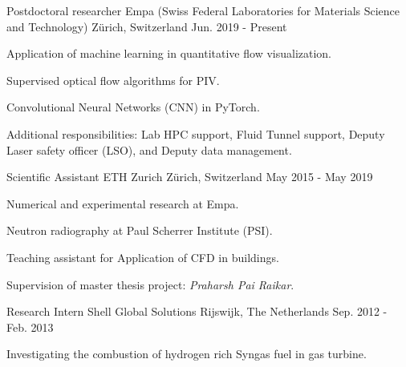\documentclass[11pt, a4paper]{awesome-cv}
\begin{document}
\begin{cventries}

  \cventry
    {Postdoctoral researcher} %
    {Empa (Swiss Federal Laboratories for Materials Science and Technology)} %
    {Z\"urich, Switzerland} %
    {Jun. 2019 - Present} %
    {
      \begin{cvitems} %
        \item {Application of machine learning in quantitative flow visualization.}
        \item {Supervised optical flow algorithms for PIV.}
        \item {Convolutional Neural Networks (CNN) in PyTorch.}
        \item {Additional responsibilities: Lab HPC support, Fluid Tunnel support, Deputy Laser safety officer (LSO), and Deputy data management.}
      \end{cvitems}
    }

  \cventry
    {Scientific Assistant}
    {ETH Zurich}
    {Z\"urich, Switzerland}
    {May 2015 - May 2019}
    {
      \begin{cvitems}
        \item {Numerical and experimental research at Empa.}
        \item {Neutron radiography at Paul Scherrer Institute (PSI).}
        \item {Teaching assistant for Application of CFD in buildings.}
        \item {Supervision of master thesis project: \textit{Praharsh Pai Raikar}.}
      \end{cvitems}
    }

    \cventry
    {Research Intern}
    {Shell Global Solutions}
    {Rijswijk, The Netherlands}
    {Sep. 2012 - Feb. 2013}
    {
      \begin{cvitems}
        \item {Investigating the combustion of hydrogen rich Syngas fuel in gas turbine.}
      \end{cvitems}
    }

\end{cventries}



\end{document}

